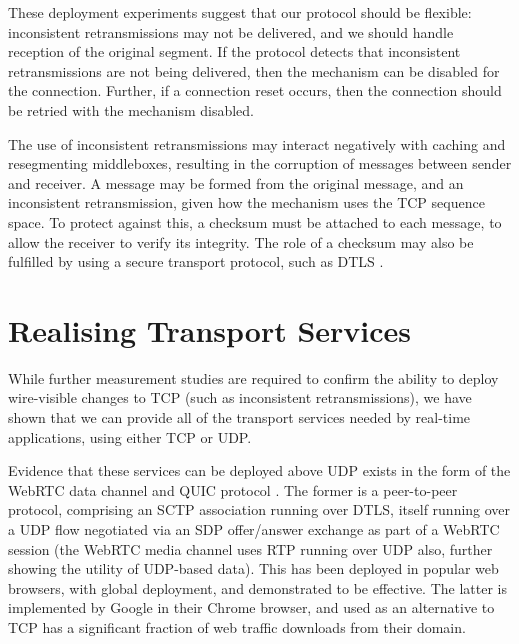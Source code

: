 \documentclass[10pt]{sig-alternate-05-2015}
\begin{document}
These deployment experiments suggest that our protocol should be
flexible: inconsistent retransmissions may not be delivered, and we should
handle reception of the original segment. If the protocol detects that
inconsistent retransmissions are not being delivered, then the mechanism
can be disabled for the connection. Further, if a connection reset occurs,
then the connection should be retried with the mechanism disabled.

The use of inconsistent retransmissions may interact negatively with
caching and resegmenting middleboxes, resulting in the corruption of
messages between sender and receiver. A message may be formed from the
original message, and an inconsistent retransmission, given how the
mechanism uses the TCP sequence space. To protect against this, a checksum
must be attached to each message, to allow the receiver to verify its
integrity. The role of a checksum may also be fulfilled by using a secure
transport protocol, such as DTLS \cite{rfc:6347}.

\section{Realising Transport Services}
\label{sec:realising}

While further measurement studies are required to confirm the ability to
deploy wire-visible changes to TCP (such as inconsistent retransmissions),
we have shown that we can provide all of the transport services needed by
real-time applications, using either TCP or UDP.

Evidence that these services can be deployed above UDP exists in the form
of the WebRTC data channel \cite{draft-ietf-rtcweb-data-channel-13} and
QUIC protocol \cite{draft-tsvwg-quic-protocol-02}.
The former is a peer-to-peer protocol, comprising an SCTP association
running over DTLS, itself running over a UDP flow negotiated via an SDP
\cite{RFC4566} offer/answer exchange \cite{RFC3264} as part of a WebRTC
session \cite{jennings:2013:rtcweb} (the WebRTC media channel uses RTP
running over UDP also, further showing the utility of UDP-based data).
This has been deployed in popular web browsers, with global deployment, and
demonstrated to be effective.  The latter is implemented by Google in their
Chrome browser, and used as an alternative to TCP has a significant
fraction of web traffic downloads from their domain.

\end{document}
